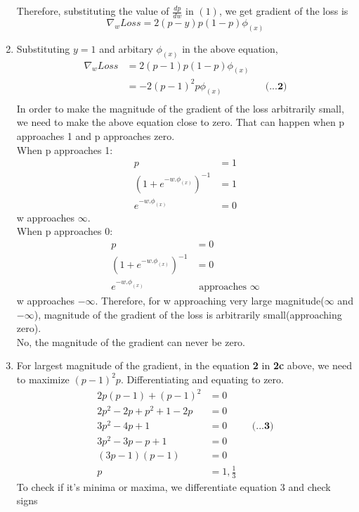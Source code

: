 \documentclass[12pt]{article}
\begin{document}
\begin{enumerate}[label=(\alph*)]
  Therefore, substituting the value of $\frac{dp}{dw}$ in $(1)$, we get gradient of the loss is $$\nabla_w Loss = 2(p-y)p(1-p)\phi_{(x)}$$
  \item Substituting $y=1$ and arbitary $\phi_{(x)}$ in the above equation,
  \begin{align*}
  \nabla_w Loss &= 2 (p-1) p (1-p) \phi_{(x)} \\
  &= -2 (p-1)^2 p \phi_{(x)} && \textbf{(...2)} \\
  \end{align*}
  In order to make the magnitude of the gradient of the loss arbitrarily small, we need to make the above equation close to zero. That can happen when p approaches 1 and p approaches zero. \\
  When p approaches 1: \\
  \begin{align*}
  p &= 1 \\
  (1 + e^{-w.\phi_{(x)}})^{-1} &= 1  \\
  e^{-w.\phi_{(x)}} &= 0
  \end{align*}
  w approaches $\infty$. \\
  When p approaches 0: \\
  \begin{align*}
   p &= 0 \\
  (1 + e^{-w.\phi_{(x)}})^{-1} &= 0  \\
  e^{-w.\phi_{(x)}} &\text{ approaches } \infty
  \end{align*}
  w approaches $-\infty$.
  Therefore, for w approaching very large magnitude($\infty$ and $-\infty$), magnitude of the gradient of the loss is arbitrarily small(approaching zero).\\
  No, the magnitude of the gradient can never be zero.
  \item For largest magnitude of the gradient, in the equation \textbf{2} in \textbf{2c} above, we need to maximize $(p-1)^2p$. Differentiating and equating to zero.
  \begin{align*}
  2p(p-1) + (p-1)^2 &= 0 \\
  2p^2 - 2p + p^2 + 1 -2p &= 0 \\
  3p^2 -4p +1 &= 0 && \textbf{(...3)} \\
  3p^2 -3p -p +1 &= 0 \\
  (3p - 1) (p - 1) &= 0 \\
  p &= 1, \frac{1}{3}
  \end{align*}
 To check if it's minima or maxima, we differentiate equation 3 and check signs \\

\end{enumerate}
\end{document}

